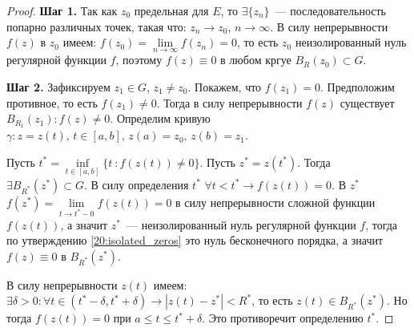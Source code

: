 \begin{proof}
    \textbf{Шаг 1.} Так как \(z_0\) предельная для \(E\), то \(\exists \{z_n\}\)~--- 
    последовательность попарно различных точек, такая что: \(z_n \rightarrow z_0, \, n \rightarrow
    \infty\). В силу непрерывности \(f(z)\) в \(z_0\) имеем: \(f(z_0) = \lim\limits_{n \rightarrow 
    \infty} f(z_n) = 0\), то есть \(z_0\) неизолированный нуль регулярной функции \(f\), поэтому 
    \(f(z) \equiv 0\) в любом кргуе \(B_R(z_0) \subset G\).

    \textbf{Шаг 2.} Зафиксируем \(z_1 \in G\), \(z_1 \ne z_0\). Покажем, что \(f(z_1) = 0\).
    Предположим противное, то есть \(f(z_1) \ne 0\). Тогда в силу непрерывности \(f(z)\) существует
    \(B_{R_1}(z_1) \colon f(z) \ne 0\). Определим кривую \(\gamma \colon z = z(t), \, t \in [a,b],
    \, z(a) = z_0, \, z(b) = z_1\).


    Пусть \(t^* = \inf\limits_{t \in [a,b]}\{t\ \colon f(z(t)) \ne 0\}\). Пусть \(z^* = z(t^*)\).
    Тогда \(\exists B_{R^*}(z^*) \subset G\). В силу определения \(t^*\) \(\forall t < t^* 
    \rightarrow f(z(t)) = 0\). В \(z^*\) \(f(z^*) = \lim\limits_{t \rightarrow t^* - 0} f(z(t)) =0\)
    в силу непрерывности сложной функции \(f(z(t))\), а значит \(z^*\)~--- неизолированный нуль 
    регулярной функции \(f\), тогда по утверждению \ref{20:isolated_zeros} это нуль бесконечного
    порядка, а значит \(f(z) \equiv 0\) в \(B_{R^*}(z^*)\).

    В силу непрерывности \(z(t)\) имеем: \(\exists \delta > 0\colon \forall t \in (t^*-\delta,
    t^*+\delta) \rightarrow |z(t) - z^*| < R^*\), то есть \(z(t) \in B_{R^*}(z^*)\). Но тогда 
    \(f(z(t)) = 0\) при \(a \le t \le t^* + \delta\). Это противоречит определению \(t^*\).
\end{proof}


